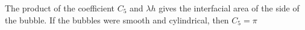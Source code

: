 The product of the coefficient $C_5$ and $\lambda h$ gives the interfacial area of the side of the bubble.
If the bubbles were smooth and cylindrical, then $C_5 = \pi$


